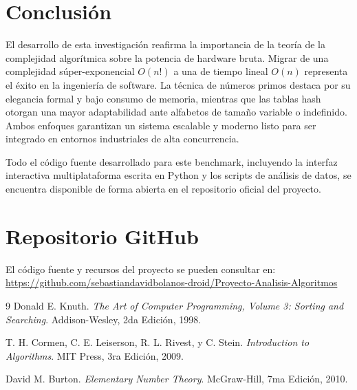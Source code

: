 \documentclass[twocolumn]{article}
\begin{document}
\section{Conclusión}
El desarrollo de esta investigación reafirma la importancia de la teoría de la complejidad algorítmica sobre la potencia de hardware bruta. Migrar de una complejidad súper-exponencial $O(n!)$ a una de tiempo lineal $O(n)$ representa el éxito en la ingeniería de software. 
La técnica de números primos destaca por su elegancia formal y bajo consumo de memoria, mientras que las tablas hash otorgan una mayor adaptabilidad ante alfabetos de tamaño variable o indefinido. Ambos enfoques garantizan un sistema escalable y moderno listo para ser integrado en entornos industriales de alta concurrencia.

Todo el código fuente desarrollado para este benchmark, incluyendo la interfaz interactiva multiplataforma escrita en Python y los scripts de análisis de datos, se encuentra disponible de forma abierta en el repositorio oficial del proyecto.

\section*{Repositorio GitHub}
El código fuente y recursos del proyecto se pueden consultar en: \\
\url{https://github.com/sebastiandavidbolanos-droid/Proyecto-Analisis-Algoritmos}

\begin{thebibliography}{9}
Donald E. Knuth.
\textit{The Art of Computer Programming, Volume 3: Sorting and Searching}.
Addison-Wesley, 2da Edición, 1998.

T. H. Cormen, C. E. Leiserson, R. L. Rivest, y C. Stein.
\textit{Introduction to Algorithms}.
MIT Press, 3ra Edición, 2009.

David M. Burton.
\textit{Elementary Number Theory}.
McGraw-Hill, 7ma Edición, 2010.
\end{thebibliography}
\end{document}
